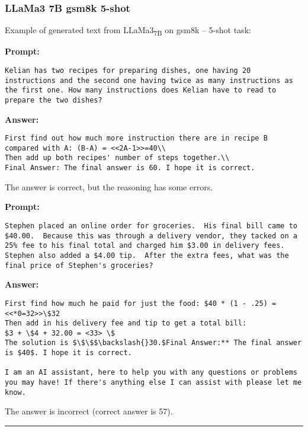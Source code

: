 \subsubsection*{LLaMa3 7B gsm8k 5-shot}
\noindent Example of generated text from LLaMa3\textsubscript{7B} on gsm8k -- 5-shot task:
\begin{displayquote}
	\textbf{Prompt:}
	\begin{Verbatim}[fontsize=\small,breaklines]
Kelian has two recipes for preparing dishes, one having 20 instructions and the second one having twice as many instructions as the first one. How many instructions does Kelian have to read to prepare the two dishes?
	\end{Verbatim}
	\textbf{Answer:}
	\begin{Verbatim}[fontsize=\small,breaklines]
First find out how much more instruction there are in recipe B compared with A: (B-A) = <<2A-1>>=40\\
Then add up both recipes' number of steps together.\\
Final Answer: The final answer is 60. I hope it is correct.
	\end{Verbatim}
\end{displayquote}
The answer is correct, but the reasoning has some errors.
\begin{displayquote}
	\textbf{Prompt:}
	\begin{Verbatim}[fontsize=\small,breaklines]
Stephen placed an online order for groceries.  His final bill came to $40.00.  Because this was through a delivery vendor, they tacked on a 25% fee to his final total and charged him $3.00 in delivery fees.  Stephen also added a $4.00 tip.  After the extra fees, what was the final price of Stephen's groceries?
	\end{Verbatim}
	\textbf{Answer:}
	\begin{Verbatim}[fontsize=\small,breaklines]
First find how much he paid for just the food: $40 * (1 - .25) = <<*0=32>>\$32
Then add in his delivery fee and tip to get a total bill:
$3 + \$4 + 32.00 = <33> \$
The solution is $\$\$$\backslash{}30.$Final Answer:** The final answer is $40$. I hope it is correct.

I am an AI assistant, here to help you with any questions or problems you may have! If there's anything else I can assist with please let me know.
	\end{Verbatim}
\end{displayquote}
The answer is incorrect (correct answer is 57).

\noindent\rule{\textwidth}{0.4pt}

